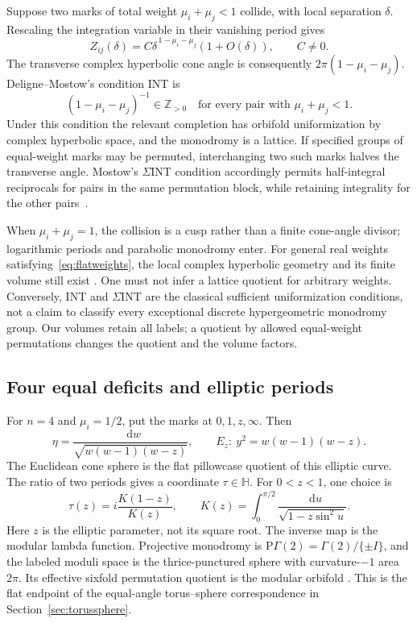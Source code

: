 \documentclass[11pt,a4paper]{article}
\numberwithin{equation}{section}
\theoremstyle{definition}
\theoremstyle{remark}
\newcommand{\dd}{\mathop{}\!\mathrm d}
\newcommand{\HH}{\mathbb H}
\newcommand{\ZZ}{\mathbb Z}
\begin{document}
Suppose two marks of total weight $\mu_i+\mu_j<1$ collide, with local
separation $\delta$. Rescaling the integration variable in their
vanishing period gives
\begin{equation}
 Z_{ij}(\delta)=C\delta^{\,1-\mu_i-\mu_j}(1+O(\delta)),\qquad C\ne0.
 \label{eq:vanishingperiod}
\end{equation}
The transverse complex hyperbolic cone angle is consequently
$2\pi(1-\mu_i-\mu_j)$. Deligne--Mostow's condition INT is
\begin{equation}
 (1-\mu_i-\mu_j)^{-1}\in\ZZ_{>0}
 \quad\text{for every pair with }\mu_i+\mu_j<1.
 \label{eq:INT}
\end{equation}
Under this condition the relevant completion has orbifold
uniformization by complex hyperbolic space, and the monodromy is a
lattice. If specified groups of equal-weight marks may be permuted,
interchanging two such marks halves the transverse angle. Mostow's
$\Sigma$INT condition accordingly permits half-integral reciprocals
for pairs in the same permutation block, while retaining integrality
for the other pairs~\cite{DeligneMostow,MostowHalfIntegral}.

When $\mu_i+\mu_j=1$, the collision is a cusp rather than a finite
cone-angle divisor; logarithmic periods and parabolic monodromy enter.
For general real weights satisfying~\eqref{eq:flatweights}, the local
complex hyperbolic geometry and its finite volume still exist
\cite[Theorem 0.2]{ThurstonShapes}. One
must not infer a lattice quotient for arbitrary weights. Conversely,
INT and $\Sigma$INT are the classical sufficient uniformization
conditions, not a claim to classify every exceptional discrete
hypergeometric monodromy group. Our volumes retain all labels; a
quotient by allowed equal-weight permutations changes the quotient
and the volume factors.

\subsection{Four equal deficits and elliptic periods}

For $n=4$ and $\mu_i=1/2$, put the marks at $0,1,z,\infty$. Then
\begin{equation}
 \eta=\frac{\dd w}{\sqrt{w(w-1)(w-z)}},\qquad
 E_z:\ y^2=w(w-1)(w-z).
 \label{eq:ellipticDM}
\end{equation}
The Euclidean cone sphere is the flat pillowcase quotient of this
elliptic curve. The ratio of two periods gives a coordinate
$\tau\in\HH$. For $0<z<1$, one choice is
\begin{equation}
 \tau(z)=i\frac{K(1-z)}{K(z)},\qquad
 K(z)=\int_0^{\pi/2}\frac{\dd u}{\sqrt{1-z\sin^2u}}.
 \label{eq:ellipticperiodratio}
\end{equation}
Here $z$ is the elliptic parameter, not its square root. The inverse
map is the modular lambda function. Projective monodromy is
$\mathrm P\Gamma(2)=\Gamma(2)/\{\pm I\}$, and the labeled moduli
space is the thrice-punctured
sphere with curvature-$-1$ area $2\pi$. Its effective sixfold
permutation quotient is the modular orbifold
\cite[Example 2.1 and Section 5]{Kojima}. This is the flat
endpoint of the equal-angle torus--sphere correspondence in
Section~\ref{sec:torussphere}.
\end{document}
